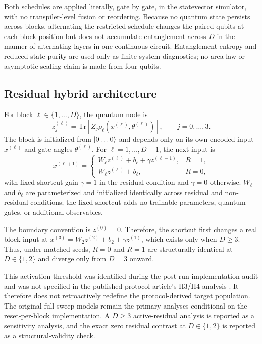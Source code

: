 \documentclass[pdflatex,sn-basic,Numbered]{sn-jnl}
\begin{document}
Both schedules are applied literally, gate by gate, in the statevector simulator, with no transpiler-level fusion or reordering. Because no quantum state persists across blocks, alternating the restricted schedule changes the paired qubits at each block position but does not accumulate entanglement across $D$ in the manner of alternating layers in one continuous circuit. Entanglement entropy and reduced-state purity are used only as finite-system diagnostics; no area-law or asymptotic scaling claim is made from four qubits.

\subsection{Residual hybrid architecture}
\label{sec:residual-arch}

For block $\ell\in\{1,\ldots,D\}$, the quantum node is
\[
z_j^{(\ell)}
=\mathrm{Tr}\!\left[Z_j\rho_\ell
  \!\left(x^{(\ell)},\theta^{(\ell)}\right)\right],
\qquad j=0,\ldots,3.
\]
The block is initialized from $\ket{0\ldots0}$ and depends only on its own encoded input $x^{(\ell)}$ and gate angles $\theta^{(\ell)}$. For $\ell=1,\ldots,D-1$, the next input is
\[
x^{(\ell+1)}=
\begin{cases}
W_\ell z^{(\ell)}+b_\ell+\gamma z^{(\ell-1)}, & R=1,\\[3pt]
W_\ell z^{(\ell)}+b_\ell, & R=0,
\end{cases}
\]
with fixed shortcut gain $\gamma=1$ in the residual condition and $\gamma=0$ otherwise. $W_\ell$ and $b_\ell$ are parameterized and initialized identically across residual and non-residual conditions; the fixed shortcut adds no trainable parameters, quantum gates, or additional observables.

The boundary convention is $z^{(0)}=0$. Therefore, the shortcut first changes a real block input at $x^{(3)}=W_2z^{(2)}+b_2+\gamma z^{(1)}$, which exists only when $D\ge3$. Thus, under matched seeds, $R=0$ and $R=1$ are structurally identical at $D\in\{1,2\}$ and diverge only from $D=3$ onward.

This activation threshold was identified during the post-run implementation audit and was not specified in the published protocol article's H3/H4 analysis \cite{shen2026gradient}. It therefore does not retroactively redefine the protocol-derived target population. The original full-sweep models remain the primary analyses conditional on the reset-per-block implementation. A $D\ge3$ active-residual analysis is reported as a sensitivity analysis, and the exact zero residual contrast at $D\in\{1,2\}$ is reported as a structural-validity check.
\end{document}

